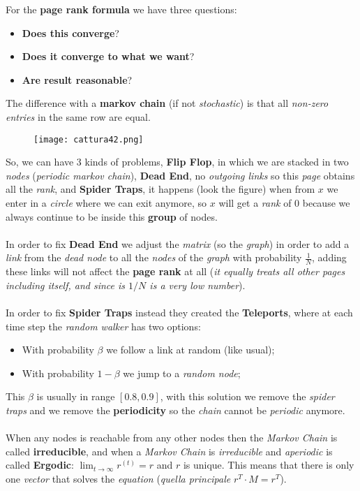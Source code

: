\documentclass{article}
\begin{document}
For the \textbf{page rank formula} we have three questions:
\begin{itemize}
\item \textbf{Does this converge}?
\item \textbf{Does it converge to what we want}?
\item \textbf{Are result reasonable}?
\end{itemize}
The difference with a \textbf{markov chain} (if not \emph{stochastic}) is that all \emph{non-zero entries} in the same row are equal.
\begin{figure}[H]
  \centering
  \texttt{[image: cattura42.png]}
\end{figure}
So, we can have 3 kinds of problems, \textbf{Flip Flop}, in which we are stacked in two \emph{nodes} (\emph{periodic markov chain}), \textbf{Dead End}, no \emph{outgoing links} so this \emph{page} obtains all the \emph{rank}, and \textbf{Spider Traps}, it happens (look the figure) when from $x$ we enter in a \emph{circle} where we can exit anymore, so $x$ will get a \emph{rank} of 0 because we always continue to be inside this \textbf{group} of nodes.\\\\
In order to fix \textbf{Dead End} we adjust the \emph{matrix} (so the \emph{graph}) in order to add a \emph{link} from the \emph{dead node} to all the \emph{nodes} of the \emph{graph} with probability $\frac{1}{N}$, adding these links will not affect the \textbf{page rank} at all (\emph{it equally treats all other pages including itself, and since is $1/N$ is a very low number}). \\\\
In order to fix \textbf{Spider Traps} instead they created the \textbf{Teleports}, where at each time step the \emph{random walker} has two options:
\begin{itemize}
\item With probability $\beta$ we follow a link at random (like usual);
\item With probability $1 - \beta$ we jump to a \emph{random node};
\end{itemize}
This $\beta$ is usually in range $\left[0.8, 0.9\right]$, with this solution we remove the \emph{spider traps} and we remove the \textbf{periodicity} so the \emph{chain} cannot be \emph{periodic} anymore. \\\\
When any nodes is reachable from any other nodes then the \emph{Markov Chain} is called \textbf{irreducible}, and when a \emph{Markov Chain} is \emph{irreducible} and \emph{aperiodic} is called \textbf{Ergodic}: $\lim_{t \rightarrow \infty} r^{(t)} = r$ and $r$ is unique. This means that there is only one \emph{vector} that solves the \emph{equation} (\emph{quella principale} $r^T \cdot M = r^T$).
\end{document}
